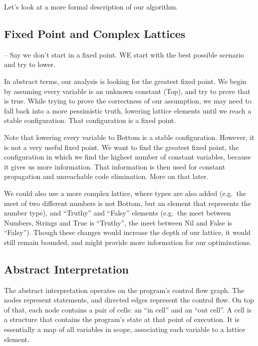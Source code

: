 \documentclass[
]{article}
\begin{document}
Let's look at a more formal description of our algorithm.

\hypertarget{fixed-point-and-complex-lattices}{%
\subsection{Fixed Point and Complex
Lattices}\label{fixed-point-and-complex-lattices}}

-- Say we don't start in a fixed point. WE start with the best possible
scenario and try to lower.

In abstract terms, our analysis is looking for the greatest fixed point.
We begin by assuming every variable is an unknown constant (Top), and
try to prove that is true. While trying to prove the correctness of our
assumption, we may need to fall back into a more pessimistic truth,
lowering lattice elements until we reach a stable configuration. That
configuration is a fixed point.

Note that lowering every variable to Bottom is a stable configuration.
However, it is not a very useful fixed point. We want to find the
greatest fixed point, the configuration in which we find the highest
number of constant variables, because it gives us more information. That
information is then used for constant propagation and unreachable code
elimination. More on that later.

We could also use a more complex lattice, where types are also added
(e.g.~the meet of two different numbers is not Bottom, but an element
that represents the number type), and ``Truthy'' and ``Falsy'' elements
(e.g.~the meet between Numbers, Strings and True is ``Truthy'', the meet
between Nil and False is ``Falsy''). Though these changes would increase
the depth of our lattice, it would still remain bounded, and might
provide more information for our optimizations.

\hypertarget{abstract-interpretation}{%
\subsection{Abstract Interpretation}\label{abstract-interpretation}}

The abstract interpretation operates on the program's control flow
graph. The nodes represent statements, and directed edges represent the
control flow. On top of that, each node contains a pair of cells: an
``in cell'' and an ``out cell''. A cell is a structure that contains the
program's state at that point of execution. It is essentially a map of
all variables in scope, associating each variable to a lattice element.
\end{document}
